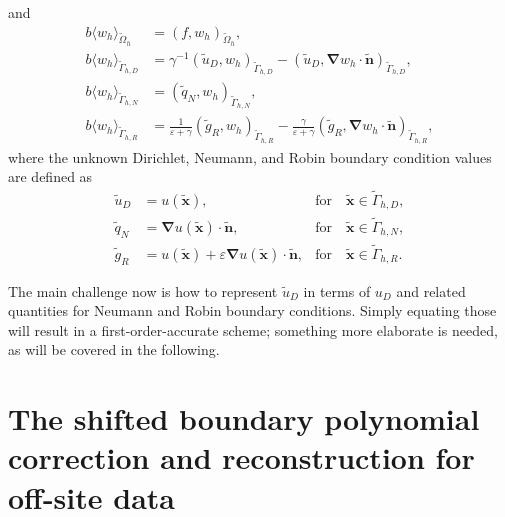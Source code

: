 \documentclass{article}
\begin{document}
and
\begin{subequations}\label{eq:unfitted_linear_form}
\begin{align} 
    b\langle w_h \rangle_{\tilde{\Omega}_h} &= (f,w_h)_{\tilde{\Omega}_h},  \\
    b\langle w_h \rangle_{\tilde{\Gamma}_{h,D}} &= \gamma^{-1} (\tilde{u}_D,w_h)_{\tilde{\Gamma}_{h,D}} 
    -(\tilde{u}_D,\boldsymbol{\nabla} w_h \cdot \tilde{\boldsymbol{n}})_{\tilde{\Gamma}_{h,D}} ,  \\
    b \langle w_h \rangle_{\tilde{\Gamma}_{h,N}} &= (\tilde{q}_N,w_h)_{\tilde{\Gamma}_{h,N}},  \\
    b\langle w_h \rangle_{\tilde{\Gamma}_{h,R}} &=  \frac{1}{\varepsilon + \gamma} (\tilde{g}_{R},w_h)_{\tilde{\Gamma}_{h,R}} - \frac{\gamma}{\varepsilon + \gamma} (\tilde{g}_{R},\boldsymbol{\nabla} w_h \cdot \tilde{\boldsymbol{n}})_{\tilde{\Gamma}_{h,R}},
\end{align}
\end{subequations}
where the unknown Dirichlet, Neumann, and Robin boundary condition values are defined as
\begin{subequations}\label{eq:unknown_boundary_data}
\begin{align}
    \tilde{u}_D    &= u(\tilde{\boldsymbol{x}}),                                          & \text{for} \quad  \tilde{\boldsymbol{x}} \in \tilde{\Gamma}_{h,D},  \\
    \tilde{q}_N    &= \boldsymbol{\nabla} u(\tilde{\boldsymbol{x}}) \cdot \tilde{\boldsymbol{n}},   &  \text{for} \quad  \tilde{\boldsymbol{x}} \in \tilde{\Gamma}_{h,N},  \\
    \tilde{g}_{R} &= u(\tilde{\boldsymbol{x}}) + \varepsilon \boldsymbol{\nabla} u(\tilde{\boldsymbol{x}}) \cdot \tilde{\boldsymbol{n}},                                          & \text{for} \quad  \tilde{\boldsymbol{x}} \in \tilde{\Gamma}_{h,R}. 
\end{align}
\end{subequations}

The main challenge now is how to represent $\tilde{u}_D$ in terms of $u_D$ and related quantities for Neumann and Robin boundary conditions. Simply equating those will result in a first-order-accurate scheme; something more elaborate is needed, as will be covered in the following.
\section{The shifted boundary polynomial correction and reconstruction for off-site data}\label{sec:sbm_rod}
\end{document}
